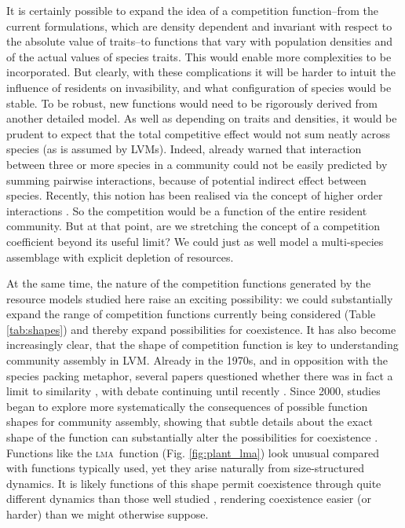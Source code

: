 \documentclass[a4paper,11pt]{article}
\newcommand{\lma}{\textsc{lma}}
\begin{document}
It is certainly possible to expand the idea of a competition function--from the current formulations, which are density dependent and invariant with respect to the absolute value of traits--to functions that vary with population densities and of the actual values of species traits. This would enable more complexities to be incorporated. But clearly, with these complications it will be harder to intuit the influence of residents on invasibility, and what configuration of species would be stable. To be robust, new functions would need to be rigorously derived from another detailed model. As well as depending on traits and densities, it would be prudent to expect that the total competitive effect would not sum neatly across species (as is assumed by LVMs). Indeed, \citet{Levine-1976} already warned that interaction between three or more species in a community could not be easily predicted by summing pairwise interactions, because of potential indirect effect between species. Recently, this notion has been realised via the concept of higher order interactions \citep{Mayfield-2017}. So the competition would be a function of the entire resident community.  But at that point, are we stretching the concept of a competition coefficient beyond its useful limit? We could just as well model a multi-species assemblage with explicit depletion of resources.

At the same time, the nature of the competition functions generated by the resource models studied here raise an exciting possibility: we could substantially expand the range of competition functions currently being considered (Table \ref{tab:shapes}) and thereby expand possibilities for coexistence. It has also become increasingly clear, that the shape of competition function is key to understanding community assembly in LVM. Already in the 1970s, and in opposition with the species packing metaphor, several papers questioned whether there was in fact a limit to similarity \citep{May-1972, Abrams-1975, Abrams-1983}, with debate continuing until recently \citep{Meszena-2006, Barabas-2012, Leimar-2013}. Since 2000, studies began to explore more systematically the consequences of possible function shapes for community assembly, showing that subtle details about the exact shape of the function can substantially alter the possibilities for coexistence \citep{Calcagno-2006, Scheffer-2006, Pigolotti-2007, Barabas-2012,Barabas-2013,DAndrea-2013,Leimar-2013}. Functions like the \lma\ function (Fig. \ref{fig:plant_lma}) look unusual compared with functions typically used, yet they arise naturally from size-structured dynamics. It is likely functions of this shape permit coexistence through quite different dynamics than those well studied \citep[e.g.][]{Leimar-2013}, rendering coexistence easier (or harder) than we might otherwise suppose.
\end{document}
